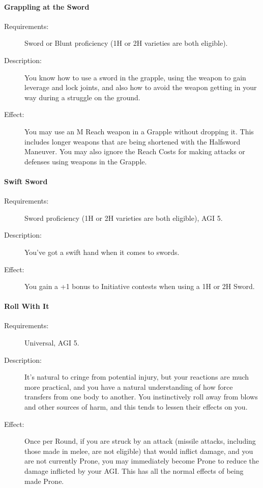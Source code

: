 \documentclass[oneside,11pt,english]{book}
\begin{document}
\paragraph{\label{talent:Grappling at the Sword}Grappling at the Sword}
	\begin{description}
		\item [Requirements:] Sword or Blunt proficiency (1H or 2H varieties are both eligible). 
		\item [Description:] You know how to use a sword in the grapple, using the weapon to gain leverage and lock joints, and also how to avoid the weapon getting in your way during a struggle on the ground. 
		\item [Effect:] You may use an M Reach weapon in a Grapple without dropping it. This includes longer weapons that are being shortened with the Halfsword Maneuver. You may also ignore the Reach Costs for making 
attacks or defenses using weapons in the Grapple.

	\end{description}
\paragraph{\label{talent:Swift Sword}Swift Sword}
	\begin{description}
		\item [Requirements:] Sword proficiency (1H or 2H varieties are both eligible), AGI 5. 
		\item [Description:] You’ve got a swift hand when it comes to swords. 
		\item [Effect:] You gain a +1 bonus to Initiative contests when using a 1H or 2H Sword. 

	\end{description}
\paragraph{\label{talent:Roll With It}Roll With It}
	\begin{description}
		\item [Requirements:] Universal, AGI 5. 
		\item [Description:] It's natural to cringe from potential injury, but your reactions are much more practical, and you have a natural understanding of how force transfers from one body to another. You instinctively roll 
away from blows and other sources of harm, and this tends to lessen their effects on you. 
		\item [Effect:] Once per Round, if you are struck by an attack (missile attacks, including those made in melee, 
are not eligible) that would inflict damage, and you are not currently Prone, you may immediately become 
Prone to reduce the damage inflicted by your AGI. This has all the normal effects of being made Prone. 

	\end{description}
\end{document}
